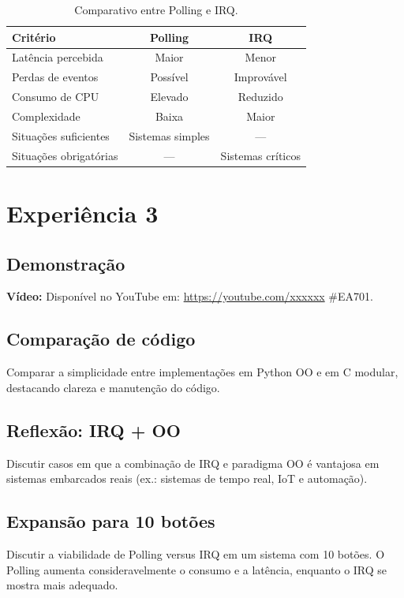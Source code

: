 \documentclass{article}
\begin{document}
\begin{table}[H]
    \centering
    \begin{tabular}{lcc}
        \toprule
        Critério & Polling & IRQ \\
        \midrule
        Latência percebida & Maior & Menor \\
        Perdas de eventos  & Possível & Improvável \\
        Consumo de CPU     & Elevado & Reduzido \\
        Complexidade       & Baixa  & Maior \\
        Situações suficientes & Sistemas simples & --- \\
        Situações obrigatórias & --- & Sistemas críticos \\
        \bottomrule
    \end{tabular}
    \caption{Comparativo entre Polling e IRQ.}
    \label{tab:polling_irq}
\end{table}

\section{Experiência 3}

\subsection{Demonstração}
\textbf{Vídeo:} Disponível no YouTube em: \url{https://youtube.com/xxxxxx} \#EA701.  

\subsection{Comparação de código}
Comparar a simplicidade entre implementações em Python OO e em C modular, destacando clareza e manutenção do código.  

\subsection{Reflexão: IRQ + OO}
Discutir casos em que a combinação de IRQ e paradigma OO é vantajosa em sistemas embarcados reais (ex.: sistemas de tempo real, IoT e automação).  

\subsection{Expansão para 10 botões}
Discutir a viabilidade de Polling versus IRQ em um sistema com 10 botões. O Polling aumenta consideravelmente o consumo e a latência, enquanto o IRQ se mostra mais adequado.  
\end{document}
